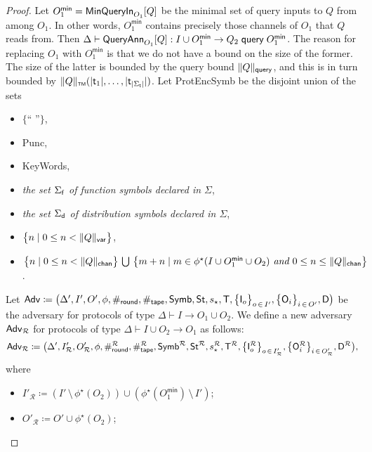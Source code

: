 \begin{proof}
Let $O_1^\textsf{min} = \mathsf{MinQueryIn}_{O_1}[Q]$ be the minimal set of query inputs to $Q$ from among $O_1$. In other words, $O_1^\textsf{min}$ contains precisely those channels of $O_1$ that $Q$ reads from. Then $\Delta \vdash \mathsf{QueryAnn}_{O_1}[Q] : I \cup O_1^\textsf{min} \to Q_2 \;\mathsf{query}\; O_1^\textsf{min}$. The reason for replacing $O_1$ with $O_1^\textsf{min}$ is that we do not have a bound on the size of the former. The size of the latter is bounded by the query bound $\Vert Q \Vert_{\mathsf{query}}$, and this is in turn bounded by $\Vert Q \Vert_{\scriptscriptstyle \mathsf{TM}}(|\mathsf{t}_1|,\ldots,|\mathsf{t}_{|\Sigma_\mathsf{t}|}|)$. Let \textsf{ProtEncSymb} be the disjoint union of the sets
\begin{itemize}
\item $\{\textsf{`` ''}\}$,
\item \textsf{Punc},
\item \textsf{KeyWords},
\item \emph{the set $\Sigma_{\mathsf{f}}$ of function symbols declared in $\Sigma$},
\item \emph{the set $\Sigma_{\mathsf{d}}$ of distribution symbols declared in $\Sigma$},
\item $\big\{n \; | \; 0 \leq n < \Vert Q \Vert_{\mathsf{var}}\big\}$,
\item $\big\{n \; | \; 0 \leq n < \Vert Q \Vert_{\mathsf{chan}}\big\} \, \bigcup \, \big\{m + n \; | \; m \in \phi^\star(I \cup O_1^\textsf{min} \cup O_2) \textit{ and } 0 \leq n \leq \Vert Q \Vert_{\mathsf{chan}}\big\}$.
\end{itemize}
Let $\mathsf{Adv} \coloneqq \big(\Delta', I', O', \phi, \#_{\mathsf{round}}, \#_{\mathsf{tape}}, \mathsf{Symb}, \mathsf{St}, s_\star, \mathsf{T}, \big\{\mathsf{I}_o\big\}_{o \, \in \, I'}, \big\{\mathsf{O}_i\big\}_{i \, \in \, O'}, \mathsf{D}\big)$ be the adversary for protocols of type $\Delta \vdash I \to O_1 \cup O_2$. We define a new adversary $\mathsf{Adv}_\mathcal{R}$ for protocols of type $\Delta \vdash I \cup O_2 \to O_1$ as follows:
\[\mathsf{Adv}_\mathcal{R} \coloneqq \big(\Delta', I'_\mathcal{R}, O'_\mathcal{R}, \phi, \#_{\mathsf{round}}^\mathcal{R}, \#_{\mathsf{tape}}^\mathcal{R}, \mathsf{Symb}^\mathcal{R}, \mathsf{St}^\mathcal{R}, s^\mathcal{R}_\star, \mathsf{T}^\mathcal{R}, \big\{\mathsf{I}^\mathcal{R}_o\big\}_{o \, \in \, I'_\mathcal{R}}, \big\{\mathsf{O}^\mathcal{R}_i\big\}_{i \, \in \, O'_\mathcal{R}}, \mathsf{D}^\mathcal{R}\big),\]
where
\begin{itemize}
\item $I'_\mathcal{R} \coloneqq (I' \, \setminus \, \phi^\star(O_2)) \cup (\phi^\star(O_1^\textsf{min}) \, \setminus \, I')$;

\item $O'_\mathcal{R} \coloneqq O' \cup \phi^\star(O_2)$;


\end{itemize}
\end{proof}
